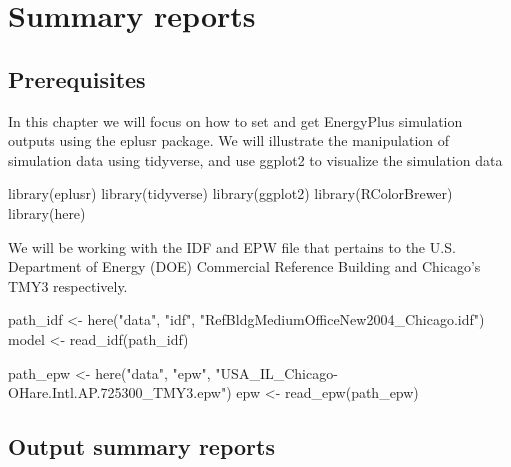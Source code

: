 \documentclass[
]{book}
\newenvironment{Shaded}{\begin{snugshade}}{\end{snugshade}}
\newcommand{\FunctionTok}[1]{\textcolor[rgb]{0.00,0.00,0.00}{#1}}
\newcommand{\NormalTok}[1]{#1}
\newcommand{\OtherTok}[1]{\textcolor[rgb]{0.56,0.35,0.01}{#1}}
\newcommand{\StringTok}[1]{\textcolor[rgb]{0.31,0.60,0.02}{#1}}
\begin{document}
\hypertarget{summary}{%
\chapter{Summary reports}\label{summary}}

\hypertarget{prerequisites-8}{%
\section{Prerequisites}\label{prerequisites-8}}

In this chapter we will focus on how to set and get EnergyPlus simulation outputs using the eplusr package. We will illustrate the manipulation of simulation data using tidyverse, and use ggplot2 to visualize the simulation data

\begin{Shaded}
\begin{Highlighting}[]
\FunctionTok{library}\NormalTok{(eplusr)}
\FunctionTok{library}\NormalTok{(tidyverse)}
\FunctionTok{library}\NormalTok{(ggplot2)}
\FunctionTok{library}\NormalTok{(RColorBrewer)}
\FunctionTok{library}\NormalTok{(here)}
\end{Highlighting}
\end{Shaded}

We will be working with the IDF and EPW file that pertains to the U.S. Department of Energy (DOE) Commercial Reference Building and Chicago's TMY3 respectively.

\begin{Shaded}
\begin{Highlighting}[]
\NormalTok{path\_idf }\OtherTok{\textless{}{-}} \FunctionTok{here}\NormalTok{(}\StringTok{"data"}\NormalTok{, }\StringTok{"idf"}\NormalTok{, }\StringTok{"RefBldgMediumOfficeNew2004\_Chicago.idf"}\NormalTok{)}
\NormalTok{model }\OtherTok{\textless{}{-}} \FunctionTok{read\_idf}\NormalTok{(path\_idf)}

\NormalTok{path\_epw }\OtherTok{\textless{}{-}} \FunctionTok{here}\NormalTok{(}\StringTok{"data"}\NormalTok{, }\StringTok{"epw"}\NormalTok{, }\StringTok{"USA\_IL\_Chicago{-}OHare.Intl.AP.725300\_TMY3.epw"}\NormalTok{)}
\NormalTok{epw }\OtherTok{\textless{}{-}} \FunctionTok{read\_epw}\NormalTok{(path\_epw)}
\end{Highlighting}
\end{Shaded}

\hypertarget{output-summary-reports}{%
\section{Output summary reports}\label{output-summary-reports}}
\end{document}
